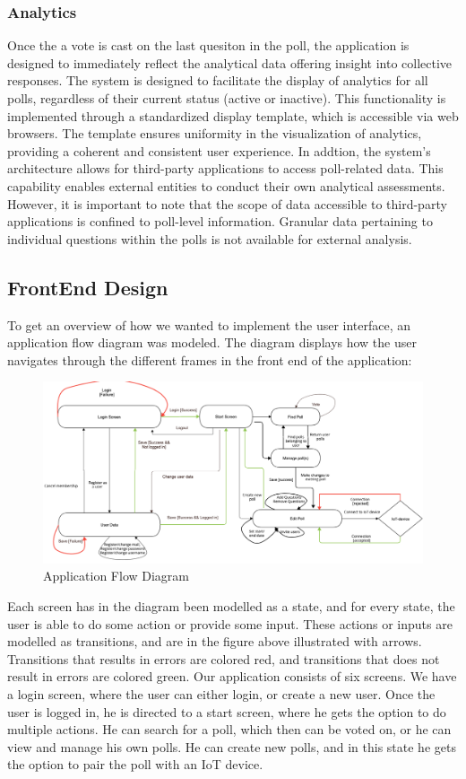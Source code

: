 \subsubsection{Analytics}
Once the a vote is cast on the last quesiton in the poll, the application is designed to immediately reflect the analytical data offering insight into collective responses.  The system is designed to facilitate the display of analytics for all polls, regardless of their current status (active or inactive).  This functionality is implemented through a standardized display template, which is accessible via web browsers. The template ensures uniformity in the visualization of analytics, providing a coherent and consistent user experience. In addtion, the system's architecture allows for third-party applications to access poll-related data.  This capability enables external entities to conduct their own analytical assessments.  However, it is important to note that the scope of data accessible to third-party applications is confined to poll-level information. Granular data pertaining to individual questions within the polls is not available for external analysis.

\subsection{FrontEnd Design} 
To get an overview of how we wanted to implement the user interface, an application flow diagram was modeled. 
The diagram displays how the user navigates through the different frames in the front end of the application:

\begin{figure}[h]
  \centering
  \includegraphics[scale=0.30]{figs/Application Flow Diagram (1).png}
  \caption{Application Flow Diagram}
  \label{fig:appFlow}
\end{figure}

Each screen has in the diagram been modelled as a state, and for every state, the user is able to do some action or provide some input. 
These actions or inputs are modelled as transitions, and are in the figure above illustrated with arrows. Transitions that results in errors are 
colored red, and transitions that does not result in errors are colored green. Our application consists of six screens. We have a login screen, 
where the user can either login, or create a new user. Once the user is logged in, he is directed to a start screen, where he gets the option to 
do multiple actions. He can search for a poll, which then can be voted on, or he can view and manage his own polls. He can create new polls,
and in this state he gets the option to pair the poll with an IoT device. 

